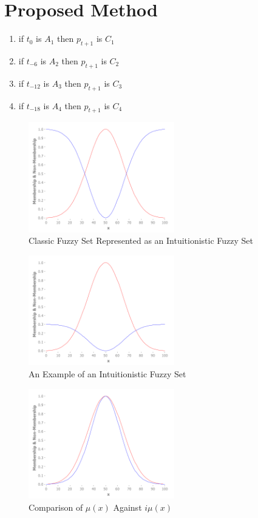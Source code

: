 \documentclass[conference]{IEEEtran}
\begin{document}
\section{Proposed Method}

\begin{enumerate}
  \item if $t_{0}$ is $A_{1}$ then $p_{t+1}$ is $C_{1}$
  \item if $t_{-6}$ is $A_{2}$ then $p_{t+1}$ is $C_{2}$
  \item if $t_{-12}$ is $A_{3}$ then $p_{t+1}$ is $C_{3}$
  \item if $t_{-18}$ is $A_{4}$ then $p_{t+1}$ is $C_{4}$
\end{enumerate}

\begin{figure}[!t]
  \centering
  \includegraphics[width=2.5in]{fs-as-ifs}
  \caption{Classic Fuzzy Set Represented as an Intuitionistic Fuzzy Set}
  \label{fs-as-ifs}
\end{figure}

\begin{figure}[!t]
  \centering
  \includegraphics[width=2.5in]{ifs}
  \caption{An Example of an Intuitionistic Fuzzy Set}
  \label{ifs}
\end{figure}

\begin{figure}[!t]
  \centering
  \includegraphics[width=2.5in]{if-membership}
  \caption{Comparison of $\mu(x)$ Against $i\mu(x)$}
  \label{if-membership}
\end{figure}
\end{document}
